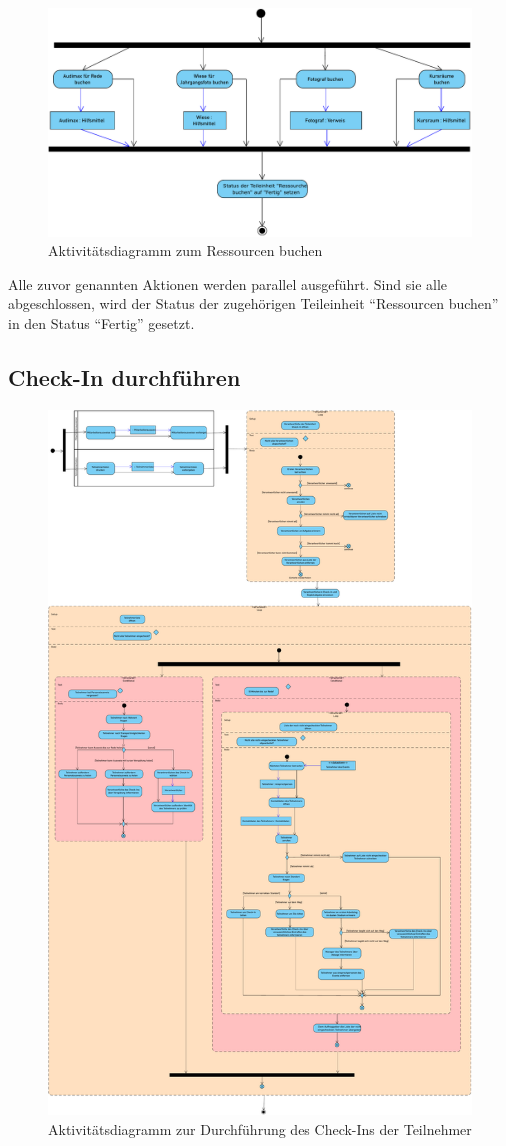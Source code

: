 \begin{figure}[ht!]
    \centering
    \includegraphics[width=0.8\columnwidth]{Bilder/act_Ressourcen_buchen.pdf}
    \caption{Aktivitätsdiagramm zum Ressourcen buchen}
    \label{act:ressourcen-buchen}
\end{figure}

Alle zuvor genannten Aktionen werden parallel ausgeführt. Sind sie alle abgeschlossen, wird der Status der zugehörigen Teileinheit \enquote{Ressourcen buchen} in den Status \enquote{Fertig} gesetzt.

\FloatBarrier

\subsection{Check-In durchführen}
\begin{figure}[ht!]
    \centering
    \includegraphics[width=0.7\columnwidth]{Bilder/act_Check_In.pdf}
    \caption{Aktivitätsdiagramm zur Durchführung des Check-Ins der Teilnehmer}
    \label{act:checkin-durchführen}
\end{figure}


